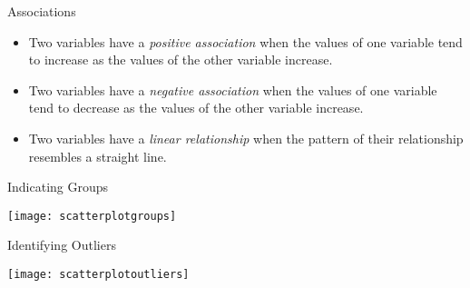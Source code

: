 \documentclass[Lecture.tex]{subfiles}
\begin{document}
\begin{frame}{Associations}
\begin{defn}
\begin{itemize}
\item<1->
Two variables have a {\it positive association} when the values of one variable tend to increase as the values of the other variable increase.
\item<2->
Two variables have a {\it negative association} when the values of one variable tend to decrease as the values of the other variable increase.
\item<3->
Two variables have a {\it linear relationship} when the pattern of their relationship resembles a straight line.
\end{itemize}
\end{defn}
\end{frame}

\begin{frame}{Indicating Groups}
\begin{center}
\texttt{[image: scatterplotgroups]}
\end{center}
\end{frame}

\begin{frame}{Identifying Outliers}
\begin{center}
\texttt{[image: scatterplotoutliers]}
\end{center}
\end{frame}
\end{document}
